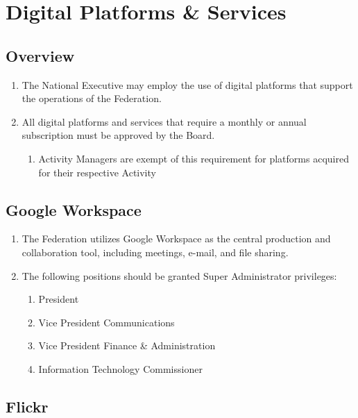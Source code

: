 \section{Digital Platforms \& Services}
\label{digital-platforms-services}

\subsection{Overview}
\label{overview-5}

\begin{enumerate}
 \item
  The National Executive may employ the use of digital platforms that support the operations of the Federation.
 \item
  All digital platforms and services that require a monthly or annual subscription must be approved by the Board.

  \begin{enumerate}
   \item
    Activity Managers are exempt of this requirement for platforms acquired for their respective Activity
  \end{enumerate}
\end{enumerate}

\subsection{Google Workspace}
\label{google-workspace}

\begin{enumerate}
 \item
  The Federation utilizes Google Workspace as the central production and collaboration tool, including meetings, e-mail, and file sharing.
 \item
  The following positions should be granted Super Administrator privileges:

  \begin{enumerate}
   \item
    President
   \item
    Vice President Communications
   \item
    Vice President Finance \& Administration
   \item
    Information Technology Commissioner
  \end{enumerate}
\end{enumerate}

\subsection{Flickr}
\label{flickr}

